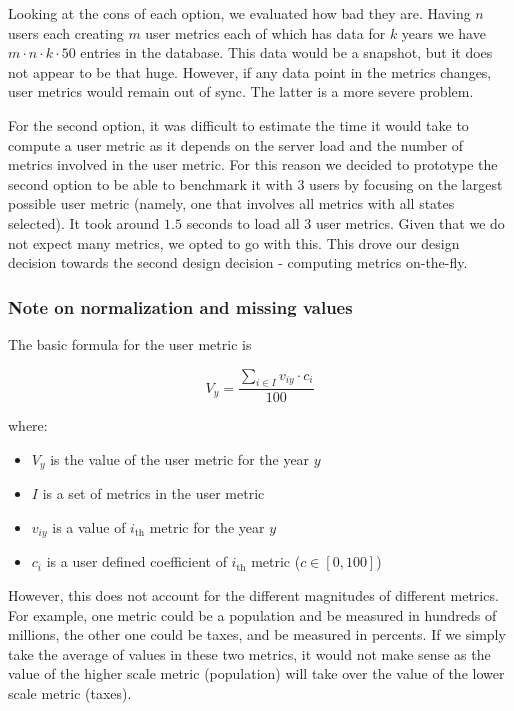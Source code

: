 			Looking at the cons of each option, we evaluated how bad they are.
			Having $n$ users each creating $m$ user metrics each of which has data for $k$ years
			we have $m \cdot n \cdot k \cdot 50$ entries in the database.
			This data would be a snapshot, but it does not appear to be that huge. However, if any data point in the metrics changes, user metrics would remain out of sync. 
			The latter is a more severe problem.

			For the second option, it was difficult to estimate the time it would take to compute a user metric 
			as it depends on the server load and the number of metrics involved in the user metric. 
			For this reason we decided to prototype the second option to be able to benchmark it with $3$ users by focusing on the
			largest possible user metric (namely, one that involves all metrics with all states selected). 
			It took around $1.5$ seconds to load all $3$ user metrics.  Given that we do not expect many metrics, we opted to go with this. 
			This drove our design decision towards the second design decision - computing metrics on-the-fly.
			
			\subsubsection{Note on normalization and missing values}
			
				The basic formula for the user metric is
				
				\[
					V_y = \frac{ \sum_{i \in I} v_{iy} \cdot c_i }{100} 
				\]
				
				where:
				\begin{itemize}
					\item
						$V_y$ is the value of the user metric for the year $y$
					\item 
						$I$ is a set of metrics in the user metric
					\item
						$v_{iy}$ is a value of $i_\text{th}$ metric for the year
						$y$
					\item
						$c_i$ is a user defined coefficient of $i_{\text{th}}$ 
						metric ($c \in [0, 100]$) 
				\end{itemize}
				
				However, this does not account for the different magnitudes of different metrics. For example, one metric could be a population and be measured in hundreds of millions, the other one could be taxes, and be measured in percents. If we simply take the average of values in these two metrics, it would not make sense as the value of the higher scale metric (population) will take over the value of the lower scale metric (taxes).


